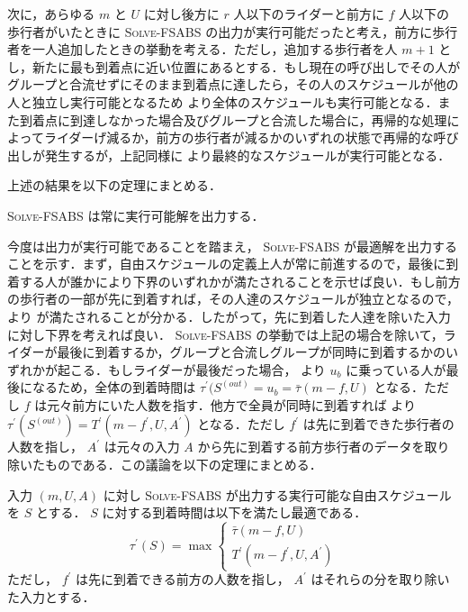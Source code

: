 次に，あらゆる $m$ と $U$ に対し後方に $r$ 人以下のライダーと前方に $f$ 人以下の歩行者がいたときに \textsc{Solve-FSABS} の出力が実行可能だったと考え，前方に歩行者を一人追加したときの挙動を考える．ただし，追加する歩行者を人 $m + 1$ とし，新たに最も到着点に近い位置にあるとする．もし現在の呼び出しでその人がグループと合流せずにそのまま到着点に達したら，その人のスケジュールが他の人と独立し実行可能となるため  より全体のスケジュールも実行可能となる．また到着点に到達しなかった場合及びグループと合流した場合に，再帰的な処理によってライダーげ減るか，前方の歩行者が減るかのいずれの状態で再帰的な呼び出しが発生するが，上記同様に  より最終的なスケジュールが実行可能となる．

上述の結果を以下の定理にまとめる．

\begin{theorem}
  \textsc{Solve-FSABS} は常に実行可能解を出力する．
\end{theorem}

今度は出力が実行可能であることを踏まえ， \textsc{Solve-FSABS} が最適解を出力することを示す．まず，自由スケジュールの定義上人が常に前進するので，最後に到着する人が誰かにより下界のいずれかが満たされることを示せば良い．もし前方の歩行者の一部が先に到着すれば，その人達のスケジュールが独立となるので，  より  が満たされることが分かる．したがって，先に到着した人達を除いた入力に対し下界を考えれば良い． \textsc{Solve-FSABS} の挙動では上記の場合を除いて，ライダーが最後に到着するか，グループと合流しグループが同時に到着するかのいずれかが起こる．もしライダーが最後だった場合，  より $u_b$ に乗っている人が最後になるため，全体の到着時間は $\tau^\prime(S^{(out)} = u_b = \bar\tau(m - f, U)$ となる．ただし $f$ は元々前方にいた人数を指す．他方で全員が同時に到着すれば  より $\tau^\prime(S^{(out)}) = T^\prime(m - f^\prime, U, A^\prime)$ となる．ただし $f^\prime$ は先に到着できた歩行者の人数を指し， $A^{\prime}$ は元々の入力 $A$ から先に到着する前方歩行者のデータを取り除いたものである．この議論を以下の定理にまとめる．

\begin{theorem}
  入力 $(m, U, A)$ に対し \textsc{Solve-FSABS} が出力する実行可能な自由スケジュールを $S$ とする． $S$ に対する到着時間は以下を満たし最適である．
  \begin{equation}
    \tau^\prime(S) = \max \begin{cases}
      \bar\tau(m - f, U) \\
      T^\prime(m - f^\prime, U, A^\prime)
    \end{cases}
  \end{equation}
  ただし， $f^\prime$ は先に到着できる前方の人数を指し， $A^\prime$ はそれらの分を取り除いた入力とする．
\end{theorem}

